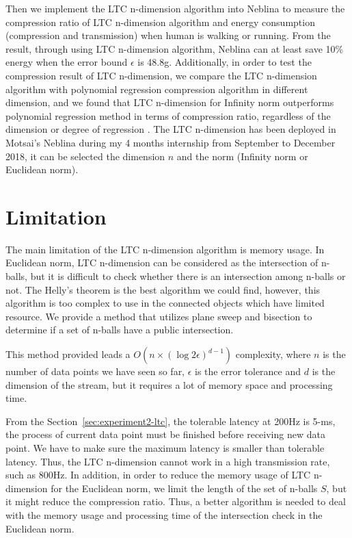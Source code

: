 Then we implement the LTC n-dimension algorithm into Neblina to measure the
compression ratio of LTC n-dimension algorithm and energy consumption
(compression and transmission) when human is walking or running. From the
result, through using LTC n-dimension algorithm, Neblina can at least save 10\%
energy when the error bound $\epsilon$ is 48.8g. Additionally, in order to test
the compression result of LTC n-dimension, we compare the LTC n-dimension
algorithm with polynomial regression compression algorithm in different
dimension, and we found that LTC n-dimension for Infinity norm outperforms
polynomial regression method in terms of compression ratio, regardless of the
dimension or degree of regression . The LTC n-dimension has been deployed in Motsai's Neblina during my 4
months internship from September to December 2018, it can be selected the
dimension $n$ and the norm (Infinity norm or Euclidean norm).

\section{Limitation}


The main limitation of the LTC n-dimension algorithm is memory usage. In
Euclidean norm, LTC n-dimension can be considered as the intersection of
n-balls, but it is difficult to check whether there is an intersection among
n-balls or not. The Helly's theorem is the best algorithm we could find,
however, this algorithm is too complex to use in the connected objects which
have limited resource.  We provide a method that utilizes plane sweep and
bisection to determine if a set of n-balls have a public intersection.

This method provided leads a $O(n\times (\log{2\epsilon})^{d-1})$ complexity,
where $n$ is the number of data points we have seen so far, $\epsilon$ is the
error tolerance and $d$ is the dimension of the stream, but it requires a lot of
memory space and processing time. 

From the Section~\ref{sec:experiment2-ltc}, the tolerable latency at 200Hz is
5-ms, the process of current data point must be finished before receiving new
data point. We have to make sure the maximum latency is smaller than tolerable
latency. Thus, the LTC n-dimension cannot work in a high transmission rate, such
as 800Hz. In addition, in order to reduce the memory usage of LTC n-dimension
for the Euclidean norm, we limit the length of the set of n-balls $S$, but it
might reduce the compression ratio. Thus, a better algorithm is needed to deal
with the memory usage and processing time of the intersection check in the
Euclidean norm.


